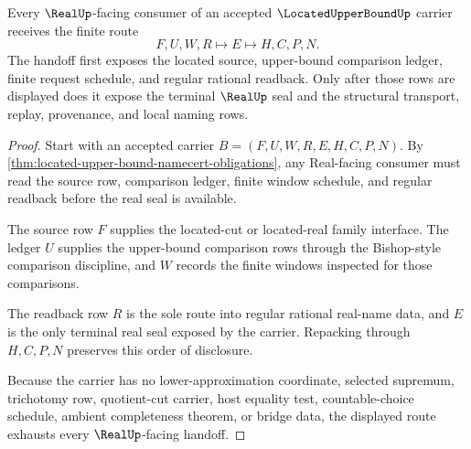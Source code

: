 \begin{theorem}
\label{thm:located-upper-bound-real-seal-handoff}
Every $\RealUp$-facing consumer of an accepted $\LocatedUpperBoundUp$ carrier receives the finite route
$$
F,U,W,R \longmapsto E \longmapsto H,C,P,N .
$$
The handoff first exposes the located source, upper-bound comparison ledger, finite request schedule, and regular rational readback. Only after those rows are displayed does it expose the terminal $\RealUp$ seal and the structural transport, replay, provenance, and local naming rows.
\end{theorem}
\begin{proof}
Start with an accepted carrier $B=(F,U,W,R,E,H,C,P,N)$. By \autoref{thm:located-upper-bound-namecert-obligations}, any Real-facing consumer must read the source row, comparison ledger, finite window schedule, and regular readback before the real seal is available.

The source row $F$ supplies the located-cut or located-real family interface. The ledger $U$ supplies the upper-bound comparison rows through the Bishop-style comparison discipline, and $W$ records the finite windows inspected for those comparisons.

The readback row $R$ is the sole route into regular rational real-name data, and $E$ is the only terminal real seal exposed by the carrier. Repacking through $H,C,P,N$ preserves this order of disclosure.

Because the carrier has no lower-approximation coordinate, selected supremum, trichotomy row, quotient-cut carrier, host equality test, countable-choice schedule, ambient completeness theorem, or bridge data, the displayed route exhausts every $\RealUp$-facing handoff.
\end{proof}

